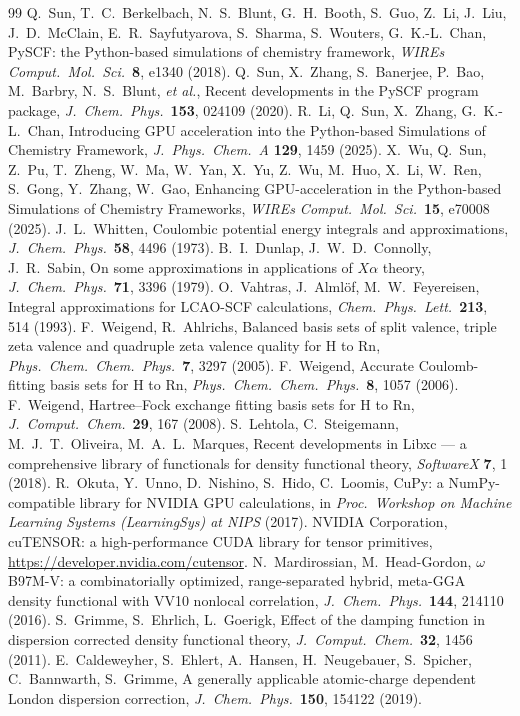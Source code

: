 \documentclass[10pt]{article}
\begin{document}
\begin{thebibliography}{99}\small
{} Q.~Sun, T.~C.~Berkelbach, N.~S.~Blunt, G.~H.~Booth, S.~Guo, Z.~Li, J.~Liu, J.~D.~McClain, E.~R.~Sayfutyarova, S.~Sharma, S.~Wouters, G.~K.-L.~Chan, PySCF: the Python-based simulations of chemistry framework, \emph{WIREs Comput.\ Mol.\ Sci.}\ \textbf{8}, e1340 (2018).
 Q.~Sun, X.~Zhang, S.~Banerjee, P.~Bao, M.~Barbry, N.~S.~Blunt, \emph{et al.}, Recent developments in the PySCF program package, \emph{J.\ Chem.\ Phys.}\ \textbf{153}, 024109 (2020).
 R.~Li, Q.~Sun, X.~Zhang, G.~K.-L.~Chan, Introducing GPU acceleration into the Python-based Simulations of Chemistry Framework, \emph{J.\ Phys.\ Chem.\ A} \textbf{129}, 1459 (2025).
 X.~Wu, Q.~Sun, Z.~Pu, T.~Zheng, W.~Ma, W.~Yan, X.~Yu, Z.~Wu, M.~Huo, X.~Li, W.~Ren, S.~Gong, Y.~Zhang, W.~Gao, Enhancing GPU-acceleration in the Python-based Simulations of Chemistry Frameworks, \emph{WIREs Comput.\ Mol.\ Sci.}\ \textbf{15}, e70008 (2025).
 J.~L.~Whitten, Coulombic potential energy integrals and approximations, \emph{J.\ Chem.\ Phys.}\ \textbf{58}, 4496 (1973).
 B.~I.~Dunlap, J.~W.~D.~Connolly, J.~R.~Sabin, On some approximations in applications of $X\alpha$ theory, \emph{J.\ Chem.\ Phys.}\ \textbf{71}, 3396 (1979).
 O.~Vahtras, J.~Almlöf, M.~W.~Feyereisen, Integral approximations for LCAO-SCF calculations, \emph{Chem.\ Phys.\ Lett.}\ \textbf{213}, 514 (1993).
 F.~Weigend, R.~Ahlrichs, Balanced basis sets of split valence, triple zeta valence and quadruple zeta valence quality for H to Rn, \emph{Phys.\ Chem.\ Chem.\ Phys.}\ \textbf{7}, 3297 (2005).
 F.~Weigend, Accurate Coulomb-fitting basis sets for H to Rn, \emph{Phys.\ Chem.\ Chem.\ Phys.}\ \textbf{8}, 1057 (2006).
 F.~Weigend, Hartree--Fock exchange fitting basis sets for H to Rn, \emph{J.\ Comput.\ Chem.}\ \textbf{29}, 167 (2008).
 S.~Lehtola, C.~Steigemann, M.~J.~T.~Oliveira, M.~A.~L.~Marques, Recent developments in Libxc --- a comprehensive library of functionals for density functional theory, \emph{SoftwareX} \textbf{7}, 1 (2018).
 R.~Okuta, Y.~Unno, D.~Nishino, S.~Hido, C.~Loomis, CuPy: a NumPy-compatible library for NVIDIA GPU calculations, in \emph{Proc.\ Workshop on Machine Learning Systems (LearningSys) at NIPS} (2017).
 NVIDIA Corporation, cuTENSOR: a high-performance CUDA library for tensor primitives, \url{https://developer.nvidia.com/cutensor}.
 N.~Mardirossian, M.~Head-Gordon, $\omega$B97M-V: a combinatorially optimized, range-separated hybrid, meta-GGA density functional with VV10 nonlocal correlation, \emph{J.\ Chem.\ Phys.}\ \textbf{144}, 214110 (2016).
 S.~Grimme, S.~Ehrlich, L.~Goerigk, Effect of the damping function in dispersion corrected density functional theory, \emph{J.\ Comput.\ Chem.}\ \textbf{32}, 1456 (2011).
 E.~Caldeweyher, S.~Ehlert, A.~Hansen, H.~Neugebauer, S.~Spicher, C.~Bannwarth, S.~Grimme, A generally applicable atomic-charge dependent London dispersion correction, \emph{J.\ Chem.\ Phys.}\ \textbf{150}, 154122 (2019).
\end{thebibliography}
\end{document}
